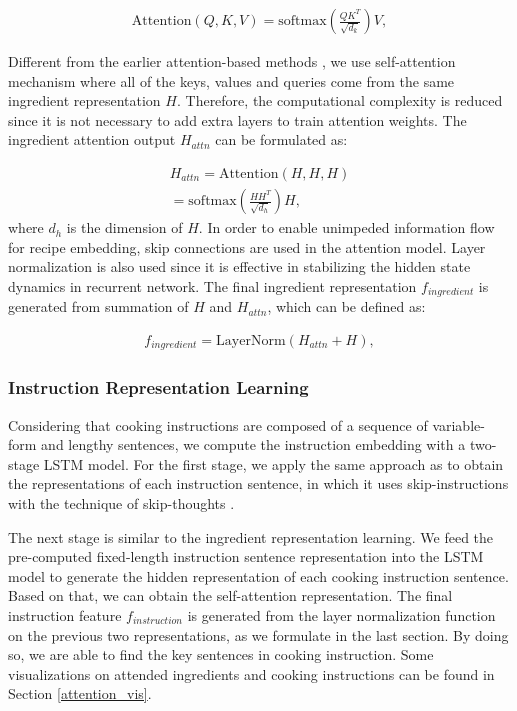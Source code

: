 \documentclass[journal]{IEEEtran}
\begin{document}
\begin{equation}
\begin{aligned}
\mathrm{Attention}(Q, K, V) = \mathrm{softmax}(\frac{QK^T}{\sqrt{d_k}})V,
\end{aligned}
\end{equation}

Different from the earlier attention-based methods \cite{chen2018deep}, we use self-attention mechanism where all of the keys, values and queries come from the same ingredient representation $H$. Therefore, the computational complexity is reduced since it is not necessary to add extra layers to train attention weights. The ingredient attention output $H_{attn}$ can be formulated as:

\begin{equation}
\begin{aligned}
H_{attn} = \mathrm{Attention}(H, H, H) \\
= \mathrm{softmax}(\frac{HH^T}{\sqrt{d_h}})H,
\end{aligned}
\end{equation}
where $d_h$ is the dimension of $H$. In order to enable unimpeded information flow for recipe embedding, skip connections are used in the attention model. Layer normalization \cite{ba2016layer} is also used since it is effective in stabilizing the hidden state dynamics in recurrent network. The final ingredient representation $f_{ingredient}$ is generated from summation of $H$ and $H_{attn}$, which can be defined as:

\begin{equation}
\begin{aligned}
f_{ingredient} = \mathrm{LayerNorm}(H_{attn} + H),
\end{aligned}
\end{equation}

\subsubsection{Instruction Representation Learning}
Considering that cooking instructions are composed of a sequence of variable-form and lengthy sentences, we compute the instruction embedding with a two-stage LSTM model. For the first stage, we apply the same approach as \cite{salvador2017learning} to obtain the representations of each instruction sentence, in which it uses skip-instructions \cite{salvador2017learning} with the technique of skip-thoughts \cite{kiros2015skip}. 

The next stage is similar to the ingredient representation learning. We feed the pre-computed fixed-length instruction sentence representation into the LSTM model to generate the hidden representation of each cooking instruction sentence. Based on that, we can obtain the self-attention representation. The final instruction feature $f_{instruction}$ is generated from the layer normalization function on the previous two representations, as we formulate in the last section. By doing so, we are able to find the key sentences in cooking instruction. Some visualizations on attended ingredients and cooking instructions can be found in Section \ref{attention_vis}.
\end{document}
